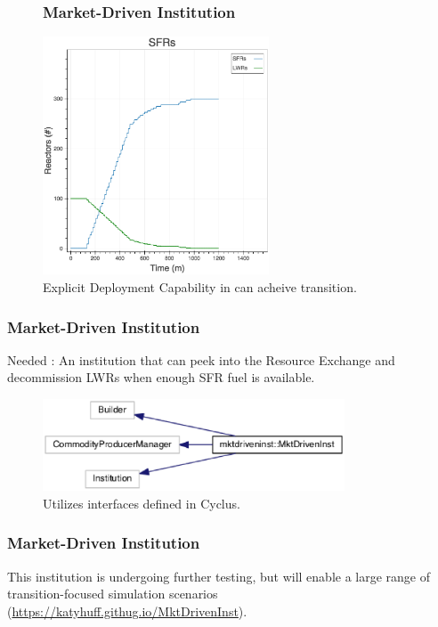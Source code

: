 


\begin{frame}[fragile]
\begin{figure}[htbp!]
\frametitle{Market-Driven Institution}
\begin{center}
\includegraphics[width=0.6\textwidth]{sfr.eps}
\end{center}
\caption{Explicit Deployment Capability in \Cyclus can acheive transition.}
\label{fig:explicit}
\end{figure}
\end{frame}

\begin{frame}[fragile]
\frametitle{Market-Driven Institution}
Needed : An institution that can peek into the Resource Exchange and decommission LWRs when enough SFR fuel is available.
\begin{figure}[htbp!]
\begin{center}
\includegraphics[width=0.8\textwidth]{mdi_inherit}
\end{center}
\caption{Utilizes interfaces defined in Cyclus.}
\label{fig:mdi_inherit}
\end{figure}
\end{frame}

\begin{frame}[fragile]
\frametitle{Market-Driven Institution}
This institution is undergoing further testing, but will enable a large range 
of transition-focused simulation scenarios
(\url{https://katyhuff.githug.io/MktDrivenInst})\cite{huff_market_2014}.
\end{frame}
